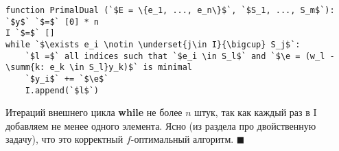 \begin{lstlisting}[escapeinside=``]
function PrimalDual (`$E = \{e_1, ..., e_n\}$`, `$S_1, ..., S_m$`):
`$y$` `$=$` [0] * n
I `$=$` []
while `$\exists e_i \notin \underset{j\in I}{\bigcup} S_j$`:
    `$l =$` all indices such that `$e_i \in S_l$` and `$\e = (w_l - \summ{k: e_k \in S_l}y_k)$` is minimal
    `$y_i$` += `$\e$`
    I.append(`$l$`)
\end{lstlisting}

Итераций внешнего цикла \textbf{while} не более $n$ штук, так как каждый раз в I добавляем не менее одного элемента. Ясно (из раздела про двойственную задачу), что это корректный $f$-оптимальный алгоритм. $\blacksquare$